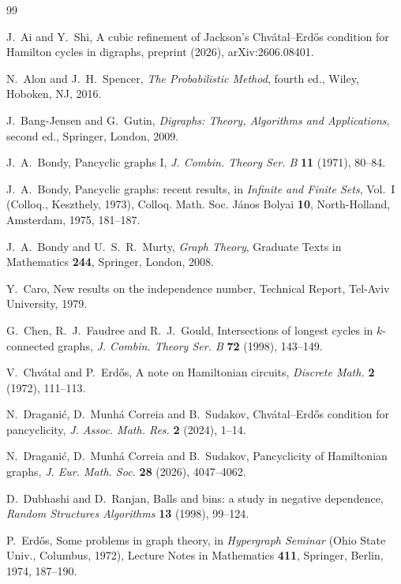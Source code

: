 \documentclass[11pt,a4paper]{article}
\theoremstyle{remark}
\numberwithin{equation}{section}
\begin{document}
	
	\begin{thebibliography}{99}
		\raggedright
		J.~Ai and Y.~Shi,
		A cubic refinement of Jackson's Chv\'atal--Erd\H{o}s condition
		for Hamilton cycles in digraphs,
		preprint (2026), arXiv:2606.08401.
		
		N.~Alon and J.~H.~Spencer,
		\emph{The Probabilistic Method}, fourth ed., Wiley, Hoboken, NJ, 2016.
		
		J.~Bang-Jensen and G.~Gutin,
		\emph{Digraphs: Theory, Algorithms and Applications}, second ed.,
		Springer, London, 2009.
		
		J.~A.~Bondy,
		Pancyclic graphs I,
		\emph{J. Combin. Theory Ser. B} \textbf{11} (1971), 80--84.
		
		J.~A.~Bondy,
		Pancyclic graphs: recent results,
		in \emph{Infinite and Finite Sets}, Vol.~I (Colloq., Keszthely, 1973),
		Colloq. Math. Soc. J\'anos Bolyai \textbf{10},
		North-Holland, Amsterdam, 1975, 181--187.
		
		J.~A.~Bondy and U.~S.~R.~Murty,
		\emph{Graph Theory}, Graduate Texts in Mathematics \textbf{244},
		Springer, London, 2008.
		
		Y.~Caro,
		New results on the independence number,
		Technical Report, Tel-Aviv University, 1979.
		
		G.~Chen, R.~J.~Faudree and R.~J.~Gould,
		Intersections of longest cycles in $k$-connected graphs,
		\emph{J. Combin. Theory Ser. B} \textbf{72} (1998), 143--149.
		
		V.~Chv\'atal and P.~Erd\H{o}s,
		A note on Hamiltonian circuits,
		\emph{Discrete Math.} \textbf{2} (1972), 111--113.
		
		N.~Dragani\'c, D.~Munh\'a Correia and B.~Sudakov,
		Chv\'atal--Erd\H{o}s condition for pancyclicity,
		\emph{J. Assoc. Math. Res.} \textbf{2} (2024), 1--14.
		
		N.~Dragani\'c, D.~Munh\'a Correia and B.~Sudakov,
		Pancyclicity of Hamiltonian graphs,
		\emph{J. Eur. Math. Soc.} \textbf{28} (2026), 4047--4062.
		
		D.~Dubhashi and D.~Ranjan,
		Balls and bins: a study in negative dependence,
		\emph{Random Structures Algorithms} \textbf{13} (1998), 99--124.
		
		P.~Erd\H{o}s,
		Some problems in graph theory,
		in \emph{Hypergraph Seminar} (Ohio State Univ., Columbus, 1972),
		Lecture Notes in Mathematics \textbf{411},
		Springer, Berlin, 1974, 187--190.
		

\end{thebibliography}
\end{document}

